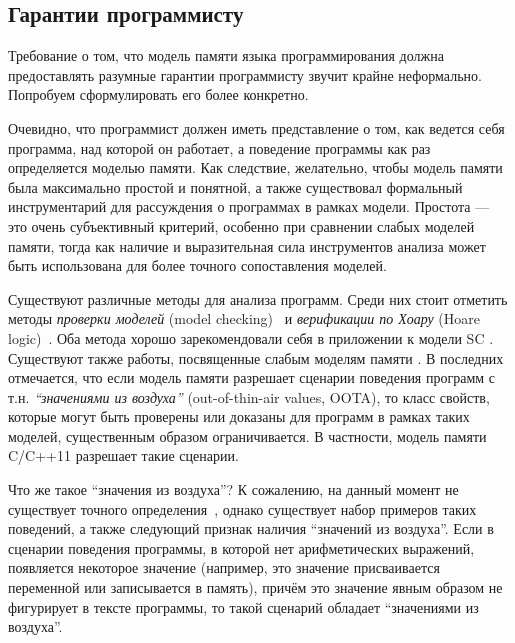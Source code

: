 \subsection{Гарантии программисту} %
Требование о том, что модель памяти языка программирования должна предоставлять разумные
гарантии программисту звучит крайне неформально.
Попробуем сформулировать его более конкретно.

Очевидно, что программист должен иметь представление о том, как ведется себя программа, над
которой он работает, а поведение программы как раз определяется моделью памяти.
Как следствие, желательно, чтобы модель памяти была максимально простой и понятной,
а также существовал формальный инструментарий для рассуждения о программах в рамках модели.
Простота --- это очень субъективный критерий, особенно при сравнении слабых моделей памяти,
тогда как наличие и выразительная сила инструментов анализа может быть
использована для более точного сопоставления моделей.

Существуют различные методы для анализа программ.
Среди них стоит отметить методы \emph{проверки моделей} (model checking)~\cite{Peled-al:BOOK08,Clarke-al:BOOK99} и
\emph{верификации по Хоару} (Hoare logic)~\cite{Hoare:CACM69}.
Оба метода хорошо зарекомендовали себя в приложении к модели SC
\cite{Owicki-Gries:AI76,Owicki-Gries:CACM76,OHearn:CONCUR04,Bornat-al:POPL05,Hobor-al:ESOP08,Dockins-al:ENTCS08,
Hobor-Gherghina:ESOP11,Gotsman-al:APLAS07,Jacobs-Piessens:POPL11,Svendsen-Birkedal:ESOP14,DinsdaleYoung-al:ECOOP10,Jung-al:POPL15,
LeyWild-Nanevski:POPL13,Sergey-al:PLDI15,Vechev-al:STTT13,Raychev-al:SAS13}.
Существуют также работы, посвященные слабым моделям памяти
\cite{Kaiser-al:ECOOP17,Vafeiadis-Narayan:OOPSLA13,Turon-al:OOPSLA14,Lahav-Vafeiadis:ICALP15,Meshman-al:FMCAD15,Dan-al:SAS13}.
В последних отмечается, что если модель памяти разрешает сценарии поведения программ с т.н.
\emph{``значениями из воздуха''} (out-of-thin-air values, OOTA),
то класс свойств, которые могут быть проверены или доказаны для программ в
рамках таких моделей, существенным образом ограничивается.
В частности, модель памяти C/C++11 разрешает такие сценарии.

Что же такое ``значения из воздуха''? К сожалению, на данный момент не существует точного определения~\cite{Boehm-Demsky:MSPC14},
однако существует набор примеров таких поведений, а также следующий признак наличия ``значений из воздуха''.
Если в сценарии поведения программы, в которой нет арифметических выражений,
появляется некоторое значение (например, это значение присваивается переменной или записывается в память), причём это
значение явным образом не фигурирует в тексте программы, то такой сценарий обладает ``значениями из воздуха''.

